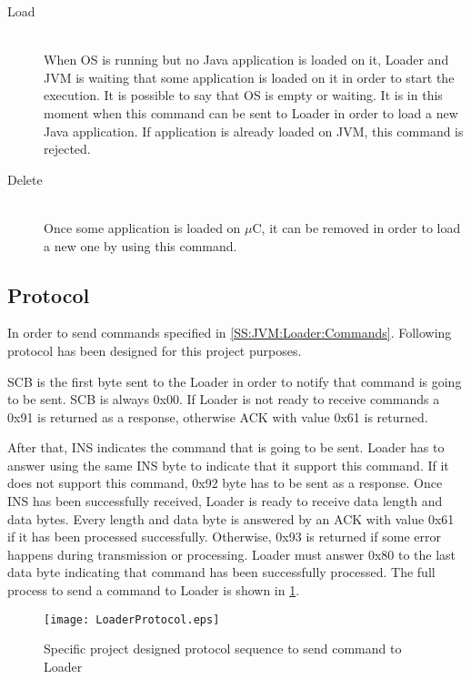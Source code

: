 \begin{description}
\item[Load] \hfill \\
When OS is running but no Java application is loaded on it, Loader and JVM is waiting that some application is loaded on it in order to start the execution. It is possible to say that OS is empty or waiting. It is in this moment when this command can be sent to Loader in order to load a new Java application. If application is already loaded on JVM, this command is rejected.
\item[Delete] \hfill \\
Once some application is loaded on $\mu$C, it can be removed in order to load a new one by using this command.
\end{description}

\subsection{Protocol}\label{SS:JVM:Loader:Protocol}
In order to send commands specified in \ref{SS:JVM:Loader:Commands}. Following protocol has been designed for this project purposes.

SCB is the first byte sent to the Loader in order to notify that command is going to be sent. SCB is always 0x00. If Loader is not ready to receive commands a 0x91 is returned as a response, otherwise ACK with value 0x61 is returned.

After that, INS indicates the command that is going to be sent. Loader has to answer using the same INS byte to indicate that it support this command. If it does not support this command, 0x92 byte has to be sent as a response.
Once INS has been successfully received, Loader is ready to receive data length and data bytes. Every length and data byte is answered by an ACK with value 0x61 if it has been processed successfully. Otherwise, 0x93 is returned if some error happens during transmission or processing. Loader must answer 0x80 to the last data byte indicating that command has been successfully processed. The full process to send a command to Loader is shown in \ref{fig:SS:JVM:Loader:ProtocolSeq}.

\begin{figure}[H]
\centering
\texttt{[image: LoaderProtocol.eps]}
\caption{Specific project designed protocol sequence to send command to Loader}
\label{fig:SS:JVM:Loader:ProtocolSeq}
\end{figure}

